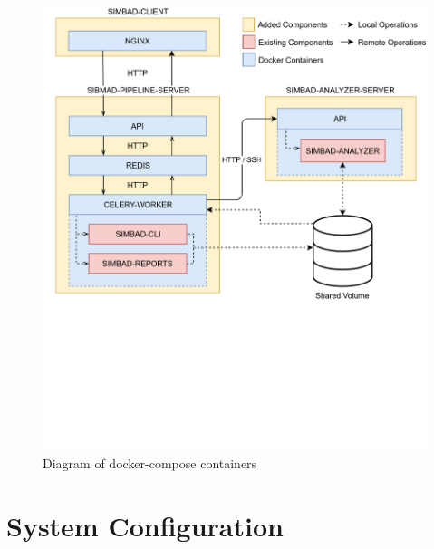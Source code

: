\begin{figure}[h!]
	\centering
		\includegraphics[width=0.9\linewidth]{diagrams/docker.png}
	\caption{Diagram of docker-compose containers}
	\label{fig:docker-containers}
\end{figure}
\section{System Configuration}
\label{sec:dockerconf}